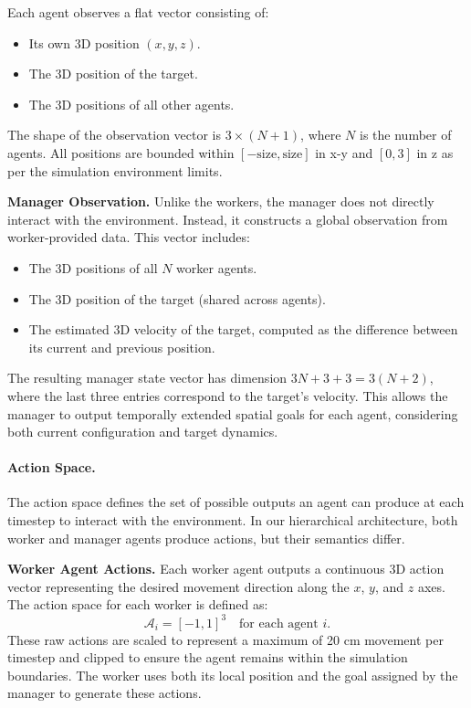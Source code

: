 \documentclass[12pt,a4paper,twoside,openany]{book}
\begin{document}
Each agent observes a flat vector consisting of:
\begin{itemize}
    \item Its own 3D position  $(x, y, z)$.
    \item The 3D position of the target.
    \item The 3D positions of all other agents.
\end{itemize}
The shape of the observation vector is $3 \times (N + 1)$, where $N$ is the number of agents. All positions are bounded within $[-\text{size}, \text{size}]$ in x-y and $[0, 3]$ in z as per the simulation environment limits.

\textbf{Manager Observation.}
Unlike the workers, the manager does not directly interact with the environment. Instead, it constructs a global observation from worker-provided data. This vector includes:
\begin{itemize}
    \item The 3D positions of all $N$ worker agents.
    \item The 3D position of the target (shared across agents).
    \item The estimated 3D velocity of the target, computed as the difference between its current and previous position.
\end{itemize}

The resulting manager state vector has dimension $3N + 3 + 3 = 3(N + 2)$, where the last three entries correspond to the target's velocity. This allows the manager to output temporally extended spatial goals for each agent, considering both current configuration and target dynamics.

\paragraph{Action Space.}
The action space defines the set of possible outputs an agent can produce at each timestep to interact with the environment. In our hierarchical architecture, both worker and manager agents produce actions, but their semantics differ.

\textbf{Worker Agent Actions.}
Each worker agent outputs a continuous 3D action vector representing the desired movement direction along the $x$, $y$, and $z$ axes. The action space for each worker is defined as:
\[
\mathcal{A}_i = [-1, 1]^3 \quad \text{for each agent } i.
\]
These raw actions are scaled to represent a maximum of 20 cm movement per timestep and clipped to ensure the agent remains within the simulation boundaries. The worker uses both its local position and the goal assigned by the manager to generate these actions.
\end{document}
